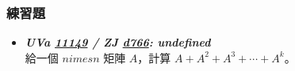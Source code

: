 \subsubsection*{練習題}
\begin{itemize}[label={\Checkmark}]
\item \textbf{\textit{UVa \href{http://uva.onlinejudge.org/external/111/11149.html}{11149} / ZJ \href{http://zerojudge.tw/ShowProblem?problemid=d766}{d766}: undefined}}\\
給一個 $n	imes{n}$ 矩陣 $A$，計算 $A+A^2+A^3+\cdots{}+A^k$。
\end{itemize}